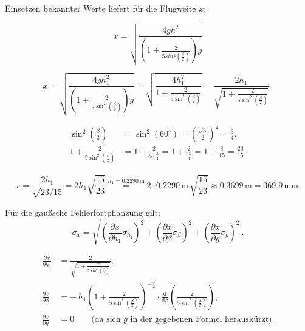 \documentclass{article}
\begin{document}
Einsetzen bekannter Werte liefert für die Flugweite $x$:

\begin{equation}
x = \sqrt{\frac{4gh_{1}^{2}}{(1+\frac{2}{5sin^{2}(\frac{\beta}{2})})g}}
\end{equation}

%

\begin{equation}
x
= \sqrt{\frac{4 g h_{1}^{2}}{\left(1+\frac{2}{5\sin^{2}\!\left(\frac{\beta}{2}\right)}\right)g}}
= \sqrt{\frac{4 h_{1}^{2}}{1+\frac{2}{5\sin^{2}\!\left(\frac{\beta}{2}\right)}}}
= \frac{2h_1}{\sqrt{1+\frac{2}{5\sin^{2}\!\left(\frac{\beta}{2}\right)}}}\,.
\end{equation}

\begin{align}
\sin^{2}\!\left(\frac{\beta}{2}\right)
&= \sin^{2}(60^\circ)
= \left(\frac{\sqrt{3}}{2}\right)^{2}
= \frac{3}{4},\\[4pt]
1+\frac{2}{5\sin^{2}\!\left(\frac{\beta}{2}\right)}
&= 1+\frac{2}{5\cdot \frac{3}{4}}
= 1+\frac{2}{\frac{15}{4}}
= 1+\frac{8}{15}
= \frac{23}{15}.
\end{align}

\begin{equation}
x
= \frac{2h_1}{\sqrt{23/15}}
= 2h_1\sqrt{\frac{15}{23}}
\stackrel{h_1=0.2290\,\mathrm{m}}{=}
2\cdot 0.2290\,\mathrm{m}\,\sqrt{\frac{15}{23}}
\approx 0.3699\,\mathrm{m}
= 369.9\,\mathrm{mm}.
\end{equation}

\vspace{.5cm}
Für die gaußsche Fehlerfortpflanzung gilt:
\begin{equation}
\sigma_x
= \sqrt{\left(\frac{\partial x}{\partial h_1}\sigma_{h_1}\right)^2
      +\left(\frac{\partial x}{\partial \beta}\sigma_{\beta}\right)^2
      +\left(\frac{\partial x}{\partial g}\sigma_{g}\right)^2}\,.
\end{equation}

\begin{align}
\frac{\partial x}{\partial h_1}
&= \frac{2}{\sqrt{1+\frac{2}{5\sin^{2}\!\left(\frac{\beta}{2}\right)}}},\\[6pt]
\frac{\partial x}{\partial \beta}
&= -\,h_1\left(1+\frac{2}{5\sin^{2}\!\left(\frac{\beta}{2}\right)}\right)^{-\frac{3}{2}}
\cdot \frac{\mathrm{d}}{\mathrm{d}\beta}\!\left(\frac{2}{5\sin^{2}\!\left(\frac{\beta}{2}\right)}\right),\\[6pt]
\frac{\partial x}{\partial g}
&= 0
\qquad\text{(da sich $g$ in der gegebenen Formel herauskürzt).}
\end{align}
\end{document}
